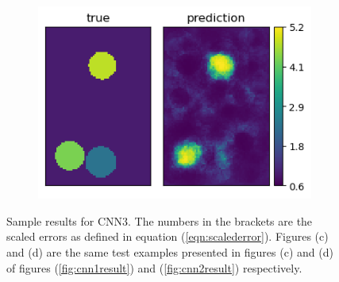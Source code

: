 \documentclass[10pt]{article}
\newcommand{\nhghalfwidth}{0.48\linewidth}
\newcommand{\nhgtotalheight}{4cm}
\begin{document}
\begin{figure}[!h]
\begin{subfigure}[c]{\nhghalfwidth}
  \end{subfigure}
  \begin{subfigure}[c]{\nhghalfwidth}
    \centering
    \includegraphics[totalheight=\nhgtotalheight]{Figures/Results3/ex4/mu.png}
  \end{subfigure}
\caption{\label{fig:cnn3result} Sample results for CNN3. The numbers in the brackets are the scaled errors as defined in equation (\ref{eqn:scalederror}). Figures (c) and (d) are the same test examples presented in figures (c) and (d) of figures (\ref{fig:cnn1result}) and (\ref{fig:cnn2result}) respectively.}  
\end{figure}
%
\end{document}
